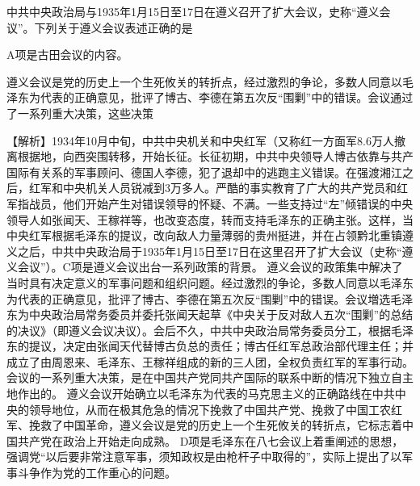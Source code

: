 \question 中共中央政治局与1935年1月15日至17日在遵义召开了扩大会议，史称``遵义会议''。下列关于遵义会议表述正确的是
\par{}
\begin{solution}A项是古田会议的内容。
\end{solution}
\question 遵义会议是党的历史上一个生死攸关的转折点，经过激烈的争论，多数人同意以毛泽东为代表的正确意见，批评了博古、李德在第五次反``围剿''中的错误。会议通过了一系列重大决策，这些决策
\par{}
\begin{solution}【解析】1934年10月中旬，中共中央机关和中央红军（又称红一方面军8.6万人撤离根据地，向西突围转移，开始长征。长征初期，中共中央领导人博古依靠与共产国际有关系的军事顾问、德国人李德，犯了退却中的逃跑主义错误。在强渡湘江之后，红军和中央机关人员锐减到3万多人。严酷的事实教育了广大的共产党员和红军指战员，他们开始产生对错误领导的怀疑、不满。一些支持过``左''倾错误的中央领导人如张闻天、王稼祥等，也改变态度，转而支持毛泽东的正确主张。这样，当中央红军根据毛泽东的提议，改向敌人力量薄弱的贵州挺进，并在占领黔北重镇遵义之后，中共中央政治局于1935年1月15日至17日在这里召开了扩大会议（史称``遵义会议''）。C项是遵义会议出台一系列政策的背景。
遵义会议的政策集中解决了当时具有决定意义的军事问题和组织问题。经过激烈的争论，多数人同意以毛泽东为代表的正确意见，批评了博古、李德在第五次反``围剿''中的错误。会议増选毛泽东为中央政治局常务委员并委托张闻天起草《中央关于反对敌人五次``围剿''的总结的决议》（即遵义会议决议）。会后不久，中共中央政治局常务委员分工，根据毛泽东的提议，决定由张闻天代替博古负总的责任；博古任红军总政治部代理主任；并成立了由周恩来、毛泽东、王稼祥组成的新的三人团，全权负责红军的军事行动。会议的一系列重大决策，是在中国共产党同共产国际的联系中断的情况下独立自主地作出的。
遵义会议开始确立以毛泽东为代表的马克思主义的正确路线在中共中央的领导地位，从而在极其危急的情况下挽救了中国共产党、挽救了中国工农红军、挽救了中国革命，遵义会议是党的历史上一个生死攸关的转折点，它标志着中国共产党在政治上开始走向成熟。
D项是毛泽东在八七会议上着重阐述的思想，强调党``以后要非常注意军事，须知政权是由枪杆子中取得的''，实际上提出了以军事斗争作为党的工作重心的问题。
\end{solution}
